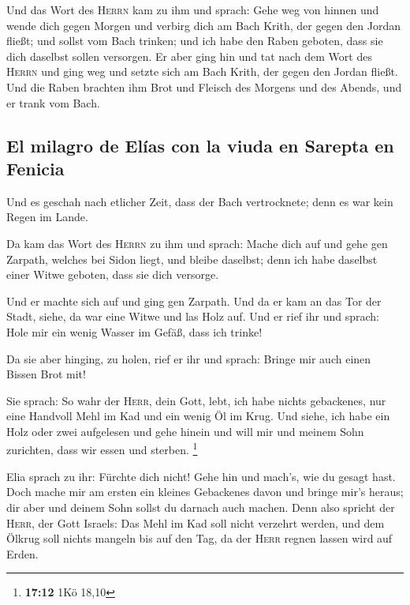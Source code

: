  Und das Wort des \textsc{Herrn} kam zu ihm und sprach:
 Gehe weg von hinnen und wende dich gegen Morgen und
verbirg dich am Bach Krith, der gegen den Jordan fließt; 
und sollst vom Bach trinken; und ich habe den Raben geboten, dass sie
dich daselbst sollen versorgen.  Er aber ging hin und tat
nach dem Wort des \textsc{Herrn} und ging weg und setzte sich am Bach
Krith, der gegen den Jordan fließt.  Und die Raben
brachten ihm Brot und Fleisch des Morgens und des Abends, und er trank
vom Bach.

\hypertarget{el-milagro-de-eluxedas-con-la-viuda-en-sarepta-en-fenicia}{%
\subsection{El milagro de Elías con la viuda en Sarepta en
Fenicia}\label{el-milagro-de-eluxedas-con-la-viuda-en-sarepta-en-fenicia}}

 Und es geschah nach etlicher Zeit, dass der Bach
vertrocknete; denn es war kein Regen im Lande.

 Da kam das Wort des \textsc{Herrn} zu ihm und sprach:
 Mache dich auf und gehe gen Zarpath, welches bei Sidon
liegt, und bleibe daselbst; denn ich habe daselbst einer Witwe geboten,
dass sie dich versorge.

 Und er machte sich auf und ging gen Zarpath. Und da er
kam an das Tor der Stadt, siehe, da war eine Witwe und las Holz auf. Und
er rief ihr und sprach: Hole mir ein wenig Wasser im Gefäß, dass ich
trinke!

 Da sie aber hinging, zu holen, rief er ihr und sprach:
Bringe mir auch einen Bissen Brot mit!

 Sie sprach: So wahr der \textsc{Herr}, dein Gott, lebt,
ich habe nichts gebackenes, nur eine Handvoll Mehl im Kad und ein wenig
Öl im Krug. Und siehe, ich habe ein Holz oder zwei aufgelesen und gehe
hinein und will mir und meinem Sohn zurichten, dass wir essen und
sterben. \footnote{\textbf{17:12} 1Kö 18,10}

 Elia sprach zu ihr: Fürchte dich nicht! Gehe hin und
mach's, wie du gesagt hast. Doch mache mir am ersten ein kleines
Gebackenes davon und bringe mir's heraus; dir aber und deinem Sohn
sollst du darnach auch machen.  Denn also spricht der
\textsc{Herr}, der Gott Israels: Das Mehl im Kad soll nicht verzehrt
werden, und dem Ölkrug soll nichts mangeln bis auf den Tag, da der
\textsc{Herr} regnen lassen wird auf Erden.

